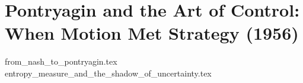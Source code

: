 \section{Pontryagin and the Art of Control: When Motion Met Strategy (1956)}

{from_nash_to_pontryagin.tex}
{entropy_measure_and_the_shadow_of_uncertainty.tex}